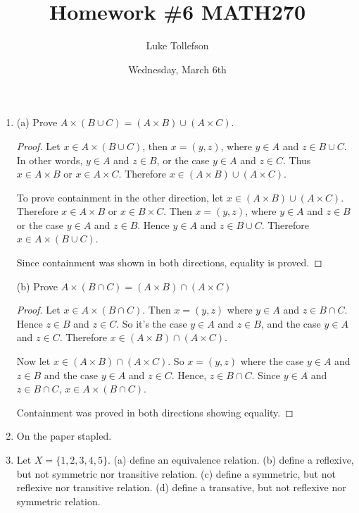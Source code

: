 \documentclass[12pt]{article}
\begin{document}
	
	\title{\Large Homework \#6 MATH270}
	\author{Luke Tollefson}
	\date{Wednesday, March 6th}
	
	\maketitle
	
	
	\begin{enumerate}
		\item (a) Prove $A\times (B\cup C)=(A\times B)\cup (A\times C)$.
		\begin{proof}
			Let $x\in A\times (B\cup C)$, then $x=(y,z)$, where $y\in A$ and $z\in B\cup C$. In other words, $y\in A$ and $z\in B$, or the case $y\in A$ and $z\in C$. Thus $x\in A\times B$ or $x\in A\times C$. Therefore $x\in (A\times B)\cup (A\times C)$.
			
			To prove containment in the other direction, let $x\in (A\times B)\cup (A\times C)$. Therefore $x\in A\times B$ or $x\in B\times C$. Then $x=(y,z)$, where $y\in A$ and $z\in B$ or the case $y\in A$ and $z\in B$. Hence $y\in A$ and $z\in B\cup C$. Therefore $x\in A\times (B\cup C)$.
			
			Since containment was shown in both directions, equality is proved.
		\end{proof}
	
		\noindent (b) Prove $A\times (B\cap C)=(A\times B)\cap (A\times C)$
		
		\begin{proof}
			Let $x\in A\times(B\cap C)$. Then $x=(y,z)$ where $y\in A$ and $z\in B\cap C$. Hence $z\in B$ and $z\in C$. So it's the case $y\in A$ and $z\in B$, and the case $y\in A$ and $z\in C$. Therefore $x\in (A\times B)\cap (A\times C)$.
			
			Now let $x\in (A\times B)\cap (A\times C)$. So $x=(y,z)$ where the case $y\in A$ and $z\in B$ and the case $y\in A$ and $z\in C$. Hence, $z\in B\cap C$. Since $y\in A$ and $z\in B\cap C$, $x\in A\times (B\cap C)$.
			
			Containment was proved in both directions showing equality.
		\end{proof}
	
		\item On the paper stapled.
		
		\item Let $X=\{1,2,3,4,5\}$. (a) define an equivalence relation. (b) define a reflexive, but not symmetric nor transitive relation. (c) define a symmetric, but not reflexive nor transitive relation. (d) define a transative, but not reflexive nor symmetric relation.
		

\end{enumerate}
\end{document}
